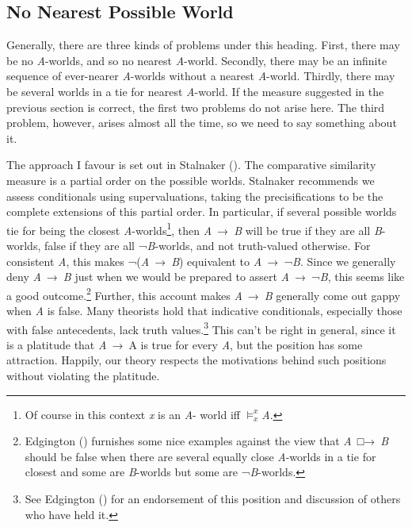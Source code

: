 \documentclass[
  11pt,
  letterpaper,
  DIV=11,
  numbers=noendperiod,
  twoside]{scrartcl}
\begin{document}
\subsection{No Nearest Possible World}\label{no-nearest-possible-world}

Generally, there are three kinds of problems under this heading. First,
there may be no \emph{A}-worlds, and so no nearest \emph{A}-world.
Secondly, there may be an infinite sequence of ever-nearer
\emph{A}-worlds without a nearest \emph{A}-world. Thirdly, there may be
several worlds in a tie for nearest \emph{A}-world. If the measure
suggested in the previous section is correct, the first two problems do
not arise here. The third problem, however, arises almost all the time,
so we need to say something about it.

The approach I favour is set out in Stalnaker
(). The comparative similarity measure
is a partial order on the possible worlds. Stalnaker recommends we
assess conditionals using supervaluations, taking the precisifications
to be the complete extensions of this partial order. In particular, if
several possible worlds tie for being the closest
\emph{A}-worlds\footnote{Of course in this context \emph{x} is an
  \emph{A}- world iff \(\vDash_x^x\)\emph{A}.}, then \emph{A}~→~\emph{B}
will be true if they are all \emph{B}-worlds, false if they are all
¬\emph{B}-worlds, and not truth-valued otherwise. For consistent
\emph{A}, this makes ¬(\emph{A}~→~\emph{B}) equivalent to
\emph{A}~→~¬\emph{B}. Since we generally deny \emph{A}~→~\emph{B} just
when we would be prepared to assert \emph{A}~→~¬\emph{B}, this seems
like a good outcome.\footnote{Edgington
  () furnishes some nice examples
  against the view that \emph{A}~□→~\emph{B} should be false when there
  are several equally close \emph{A}-worlds in a tie for closest and
  some are \emph{B}-worlds but some are ¬\emph{B}-worlds.} Further, this
account makes \emph{A}~→~\emph{B} generally come out gappy when \emph{A}
is false. Many theorists hold that indicative conditionals, especially
those with false antecedents, lack truth values.\footnote{See Edgington
  () for an endorsement of this
  position and discussion of others who have held it.} This can't be
right in general, since it is a platitude that \emph{A}~→~A is true for
every \emph{A}, but the position has some attraction. Happily, our
theory respects the motivations behind such positions without violating
the platitude.
\end{document}

